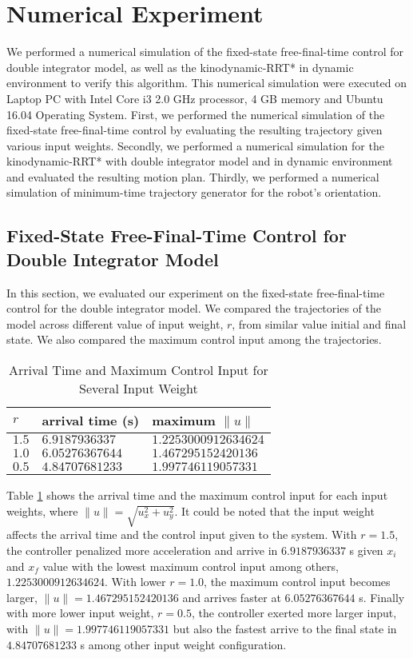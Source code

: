 \documentclass[../thesis.tex]{subfiles}
\begin{document}
	
\section{Numerical Experiment}
We performed a numerical simulation of the fixed-state free-final-time control for double integrator model, as well as the kinodynamic-RRT* in dynamic environment to verify this algorithm. This numerical simulation were executed on Laptop PC with Intel Core i3 2.0 GHz processor, 4 GB memory and Ubuntu 16.04 Operating System. First, we performed the numerical simulation of the fixed-state free-final-time control by evaluating the resulting trajectory given various input weights. Secondly, we performed a numerical simulation for the kinodynamic-RRT* with double integrator model and in dynamic environment and evaluated the resulting motion plan. Thirdly, we performed a numerical simulation of minimum-time trajectory generator for the robot's orientation.

\subsection{Fixed-State Free-Final-Time Control for Double Integrator Model}
In this section, we evaluated our experiment on the fixed-state free-final-time control for the double integrator model. We compared the trajectories of the model across different value of input weight, $r$, from similar value initial and final state. We also compared the maximum control input among the trajectories.

\begin{table}[]
\caption{Arrival Time and Maximum Control Input for Several Input Weight}
\label{trajectories_table}
\centering
\begin{tabular}{|l|l|l|}
\hline
$r$ & arrival time (s) & maximum $\| u \|$ \\ \hline
$1.5$ & $6.9187936337$ & $1.2253000912634624$ \\ \hline
$1.0$ & $6.05276367644$ & $1.467295152420136$ \\ \hline
$0.5$ & $4.84707681233$ & $1.997746119057331$ \\ \hline
\end{tabular}
\end{table}
Table \ref{trajectories_table} shows the arrival time and the maximum control input for each input weights, where $\|u\| = \sqrt{u_x^2+u_y^2}$. It could be noted that the input weight affects the arrival time and the control input given to the system. With $r=1.5$, the controller penalized more acceleration and arrive in $6.9187936337$ s given $x_i$ and $x_f$ value with the lowest maximum control input among others, $1.2253000912634624$. With lower $r=1.0$, the maximum control input becomes larger, $\|u\|=1.467295152420136$ and arrives faster at $6.05276367644$ s. Finally with more lower input weight, $r=0.5$, the controller exerted more larger input, with $\|u\|=1.997746119057331$ but also the fastest arrive to the final state in $4.84707681233$ s among other input weight configuration.
\end{document}
